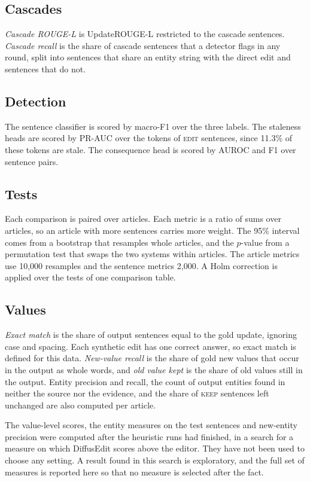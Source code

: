 \documentclass[]{paper}
\newcommand{\keep}{\textsc{keep}}
\newcommand{\edit}{\textsc{edit}}
\begin{document}
\subsection{Cascades}

\emph{Cascade ROUGE-L} is UpdateROUGE-L restricted to the cascade sentences. \emph{Cascade recall} is the share of cascade sentences that a detector flags in any round, split into sentences that share an entity string with the direct edit and sentences that do not.

\subsection{Detection}

The sentence classifier is scored by macro-F1 over the three labels. The staleness heads are scored by PR-AUC over the tokens of \edit{} sentences, since 11.3\% of these tokens are stale. The consequence head is scored by AUROC and F1 over sentence pairs.

\subsection{Tests}

Each comparison is paired over articles. Each metric is a ratio of sums over articles, so an article with more sentences carries more weight. The 95\% interval comes from a bootstrap that resamples whole articles, and the $p$-value from a permutation test that swaps the two systems within articles. The article metrics use 10,000 resamples and the sentence metrics 2,000. A Holm correction is applied over the tests of one comparison table.

\subsection{Values}

\emph{Exact match} is the share of output sentences equal to the gold update, ignoring case and spacing. Each synthetic edit has one correct answer, so exact match is defined for this data. \emph{New-value recall} is the share of gold new values that occur in the output as whole words, and \emph{old value kept} is the share of old values still in the output. Entity precision and recall, the count of output entities found in neither the source nor the evidence, and the share of \keep{} sentences left unchanged are also computed per article.

The value-level scores, the entity measures on the test sentences and new-entity precision were computed after the heuristic runs had finished, in a search for a measure on which DiffusEdit scores above the editor. They have not been used to choose any setting. A result found in this search is exploratory, and the full set of measures is reported here so that no measure is selected after the fact.
\end{document}
